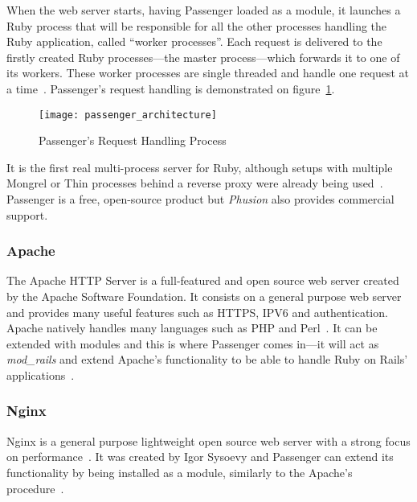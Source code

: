 When the web server starts, having Passenger loaded as a module, it launches a Ruby process that will be responsible for all the other processes handling the Ruby application, called ``worker processes''. Each request is delivered to the firstly created Ruby processes---the master process---which forwards it to one of its workers. These worker processes are single threaded and handle one request at a time~\cite{ruby_webservers}. Passenger's request handling is demonstrated on figure~\ref{fig:passenger_architecture}.
\begin{figure}[h!t]
  \centering
  \caption{Passenger's Request Handling Process}
  \label{fig:passenger_architecture}
    \texttt{[image: passenger\_architecture]}
\end{figure}
It is the first real multi-process server for Ruby, although setups with multiple Mongrel or Thin processes behind a reverse proxy were already being used~\cite{passenger_whatis}. Passenger is a free, open-source product but \textit{Phusion} also provides commercial support.


\subsubsection{Apache}
The Apache HTTP Server is a full-featured and open source web server created by the Apache Software Foundation. It consists on a general purpose web server and provides many useful features such as HTTPS, IPV6 and authentication. Apache natively handles many languages such as PHP and Perl~\cite{apache_features}. It can be extended with modules and this is where Passenger comes in---it will act as \textit{mod\_rails} and extend Apache's functionality to be able to handle Ruby on Rails' applications~\cite{passenger_whatis}.


\subsubsection{Nginx}
Nginx is a general purpose lightweight open source web server with a strong focus on performance~\cite{nginx_features}. It was created by Igor Sysoevy and Passenger can extend its functionality by being installed as a module, similarly to the Apache's procedure~\cite{passenger_whatis}.


